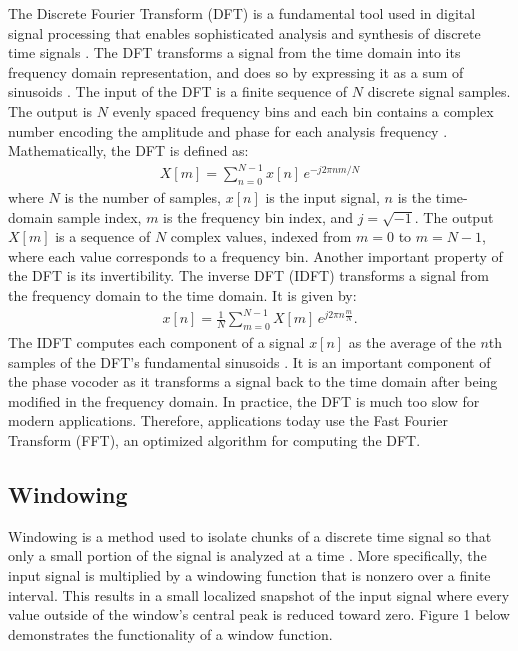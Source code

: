 \documentclass[12pt]{article}
\begin{document}
The Discrete Fourier Transform (DFT) is a fundamental tool used in digital signal processing that 
enables sophisticated analysis and synthesis of discrete time signals \cite{lyons2010understanding}.   
The DFT transforms a signal from the time domain into its frequency domain representation, and does so by   
expressing it as a sum of sinusoids \cite{lyons2010understanding}. The input of the DFT is a finite 
sequence of $N$ discrete signal samples. The output is $N$ evenly spaced frequency bins and each bin contains a complex number encoding the
amplitude and phase for each analysis frequency \cite{mcfee_dstbook}.  
Mathematically, the DFT is defined as:
\begin{align}
  X[m] = \sum_{n=0}^{N-1} x[n] \, e^{-j 2\pi nm/N}
\end{align}
where $N$ is the number of samples, $x[n]$ is the input signal, $n$ is the time-domain sample index, $m$ is the frequency bin index, 
and $j = \sqrt{-1}$. The output $X[m]$ is a sequence of $N$ complex values, indexed from $m = 0$ to $m = N-1$, where each value 
corresponds to a frequency bin. 
Another important property of the DFT is its invertibility. The inverse DFT (IDFT) transforms a signal from the frequency domain to the time domain. It is given by: 
\begin{align}
  x[n] = \frac{1}{N} \sum_{m=0}^{N-1} X[m] \, e^{j 2\pi n\frac{m}{N}}.
\end{align}
The IDFT computes each component of a signal $x[n]$ as the average of the $n$th samples of the DFT's fundamental sinusoids \cite{mcfee_dstbook}. 
It is an important component of the phase vocoder as it transforms a signal back to the time domain after being modified
in the frequency domain. In practice, the DFT is much too slow for modern applications. Therefore, applications today use the Fast Fourier Transform (FFT), 
an optimized algorithm for computing the DFT.

\subsection{Windowing}
Windowing is a method used to isolate chunks of a discrete time signal so that only a small portion of the signal is analyzed at a time \cite{barry2008time}.
More specifically, the input signal is multiplied by a windowing function that is nonzero over a finite interval. This results in a small localized snapshot of the input signal
where every value outside of the window's central peak is reduced toward zero\cite{royer2019pitch}. Figure 1 below demonstrates the functionality of a window function. 
\end{document}
